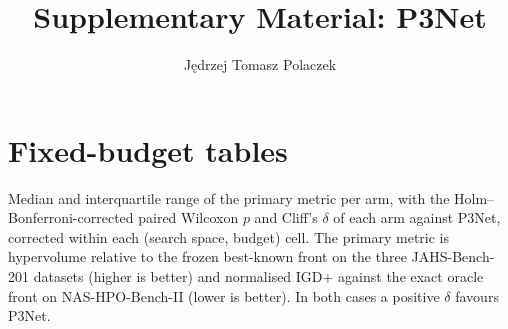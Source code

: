 \documentclass[sigconf,authordraft]{acmart}
\title{Supplementary Material: P3Net}
\author{Jędrzej Tomasz Polaczek}
\affiliation{\institution{TBD}\city{Szczecin}\country{Poland}}
\begin{document}
\maketitle

\section*{Fixed-budget tables}

Median and interquartile range of the primary metric per arm, with the Holm--Bonferroni-corrected paired
Wilcoxon $p$ and Cliff's $\delta$ of each arm against P3Net, corrected within each (search space, budget) cell.
The primary metric is hypervolume relative to the frozen best-known front on the three JAHS-Bench-201 datasets
(higher is better) and normalised IGD+ against the exact oracle front on NAS-HPO-Bench-II (lower is better).
In both cases a positive $\delta$ favours P3Net.


\end{document}
